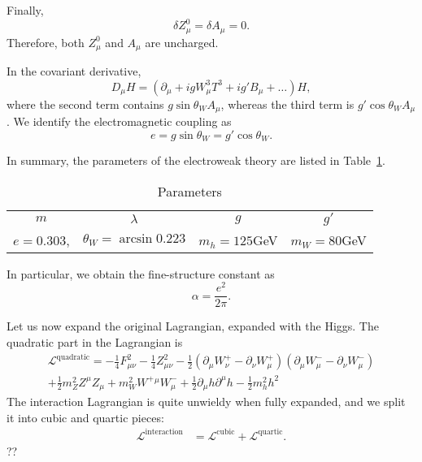 Finally, 
\begin{equation}
  \delta Z^0_{\mu} = \delta A_{\mu} = 0.
\end{equation}
Therefore, both $Z^0_{\mu}$ and $A_{\mu}$ are uncharged.

\begin{remark}
  In the covariant derivative, 
  \begin{equation}
    D_{\mu} H = (\partial_{\mu} + i g W_{\mu}^3 T^3 + i g' B_{\mu} + \dots) H,
  \end{equation}
  where the second term contains $g \sin \theta_W A_{\mu}$, whereas the third term is $g' \cos \theta_W A_{\mu}$. We identify the electromagnetic coupling as
  \begin{equation}
    e = g \sin \theta_W = g' \cos \theta_W.
  \end{equation}
\end{remark}

In summary, the parameters of the electroweak theory are listed in Table~\ref{tab:l19t2}.
\begin{table}[htpb]
  \centering
  \begin{tabular}{c c c c}
    $m$ & $\lambda$ & $g$ & $g'$\\
    $e = 0.303$, & $\theta_W = \arcsin 0.223$ & $m_h = 125$GeV & $m_W = 80$GeV
  \end{tabular}
  \caption{Parameters}
  \label{tab:l19t2}
\end{table}
In particular, we obtain the fine-structure constant as
\begin{equation}
  \alpha = \frac{e^2}{2 \pi}.
\end{equation}

Let us now expand the original Lagrangian, expanded with the Higgs.
The quadratic part in the Lagrangian is
\begin{align}
  \mathscr{L}^{\text{quadratic}} = -\frac{1}{4} F_{\mu\nu}^2 - \frac{1}{4} Z_{\mu\nu}^2 - \frac{1}{2} (\partial_{\mu}  W_{\nu}^+ - \partial_{\nu} W_{\mu}^+) (\partial_{\mu} W^-_{\mu} - \partial_{\nu} W^-_{\mu})\\
  + \frac{1}{2} m^2_Z Z^{\mu} Z_{\mu} + m_W^2 W^+{}^{\mu} W^-_{\mu} + \frac{1}{2} \partial_{\mu} h \partial^{\mu} h - \frac{1}{2} m^2_h h^2
\end{align}
The interaction Lagrangian is quite unwieldy when fully expanded, and we split it into cubic and quartic pieces:
\begin{align}
  \mathscr{L}^{\text{interaction}} &= \mathscr{L}^{\text{cubic}} + \mathscr{L}^{\text{quartic}}.
\end{align}
??


